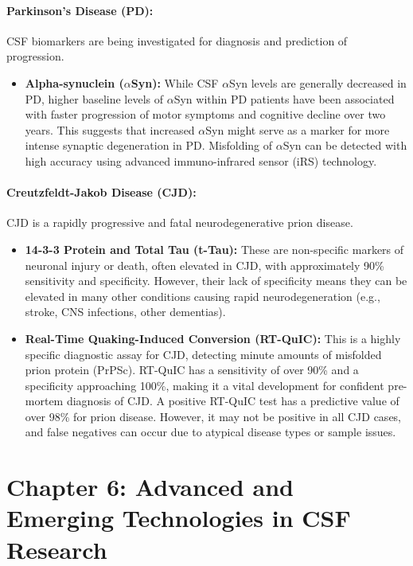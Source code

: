 	\paragraph{Parkinson's Disease (PD):} CSF biomarkers are being investigated for diagnosis and prediction of progression.
	\begin{itemize}
		\item \textbf{Alpha-synuclein ($\alpha$Syn):} While CSF $\alpha$Syn levels are generally decreased in PD, higher baseline levels of $\alpha$Syn within PD patients have been associated with faster progression of motor symptoms and cognitive decline over two years. This suggests that increased $\alpha$Syn might serve as a marker for more intense synaptic degeneration in PD. Misfolding of $\alpha$Syn can be detected with high accuracy using advanced immuno-infrared sensor (iRS) technology.
	\end{itemize}
	
	\paragraph{Creutzfeldt-Jakob Disease (CJD):} CJD is a rapidly progressive and fatal neurodegenerative prion disease.
	\begin{itemize}
		\item \textbf{14-3-3 Protein and Total Tau (t-Tau):} These are non-specific markers of neuronal injury or death, often elevated in CJD, with approximately 90\% sensitivity and specificity. However, their lack of specificity means they can be elevated in many other conditions causing rapid neurodegeneration (e.g., stroke, CNS infections, other dementias).
		\item \textbf{Real-Time Quaking-Induced Conversion (RT-QuIC):} This is a highly specific diagnostic assay for CJD, detecting minute amounts of misfolded prion protein (PrPSc). RT-QuIC has a sensitivity of over 90\% and a specificity approaching 100\%, making it a vital development for confident pre-mortem diagnosis of CJD. A positive RT-QuIC test has a predictive value of over 98\% for prion disease. However, it may not be positive in all CJD cases, and false negatives can occur due to atypical disease types or sample issues.
	\end{itemize}
	
	\section*{Chapter 6: Advanced and Emerging Technologies in CSF Research}
	
